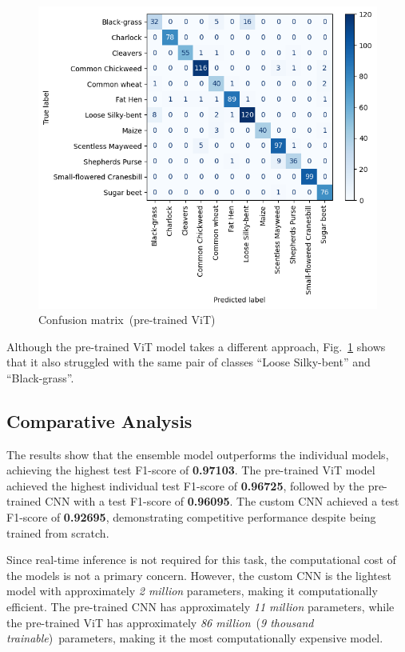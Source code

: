 \begin{figure}[htbp]
    \centerline{\includegraphics[width=0.9\linewidth]{../../resources/vit/confusion.png}}
    \caption{Confusion matrix~(pre-trained ViT)}
    \label{fig:confusion-matrix-pretrained-vit}
\end{figure}

Although the pre-trained ViT model takes a different approach, Fig.~\ref{fig:confusion-matrix-pretrained-vit} shows that it also struggled with the same pair of classes ``Loose Silky-bent'' and ``Black-grass''.

\subsection{Comparative Analysis}

The results show that the ensemble model outperforms the individual models, achieving the highest test F1-score of \textbf{0.97103}. The pre-trained ViT model achieved the highest individual test F1-score of \textbf{0.96725}, followed by the pre-trained CNN with a test F1-score of \textbf{0.96095}. The custom CNN achieved a test F1-score of \textbf{0.92695}, demonstrating competitive performance despite being trained from scratch.

Since real-time inference is not required for this task, the computational cost of the models is not a primary concern. However, the custom CNN is the lightest model with approximately \textit{2 million} parameters, making it computationally efficient. The pre-trained CNN has approximately \textit{11 million} parameters, while the pre-trained ViT has approximately \textit{86 million}~(\textit{9 thousand trainable})~parameters, making it the most computationally expensive model.

